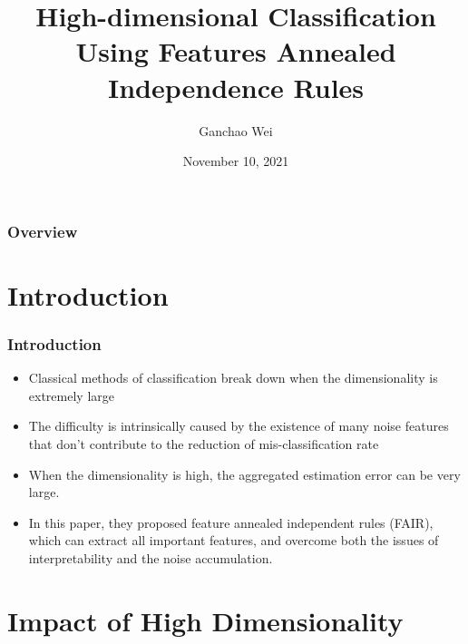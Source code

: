 \documentclass{beamer}
\title[FAIR]{High-dimensional Classification Using Features Annealed Independence Rules}
\author{Ganchao Wei}
\date{November 10, 2021}
\begin{document}
	
	\begin{frame}
		\titlepage %
	\end{frame}
	
	\begin{frame}
		\frametitle{Overview} %
		\tableofcontents
	\end{frame}
	
	
	\section{Introduction}
	
	\begin{frame}
		\frametitle{Introduction}
		\begin{itemize}
			\item 
			Classical methods of classification break down when the dimensionality is extremely large
			\item
			The difficulty is intrinsically caused by the existence of many noise features that don't contribute to the reduction of mis-classification rate
			\item
			When the dimensionality is high, the aggregated estimation error can be very large.
			\item
			In this paper, they proposed feature annealed independent rules (FAIR), which can extract all important features, and overcome both the issues of interpretability and the noise accumulation.
		\end{itemize}
	\end{frame}
	
	\section{Impact of High Dimensionality}
	
\end{document}

